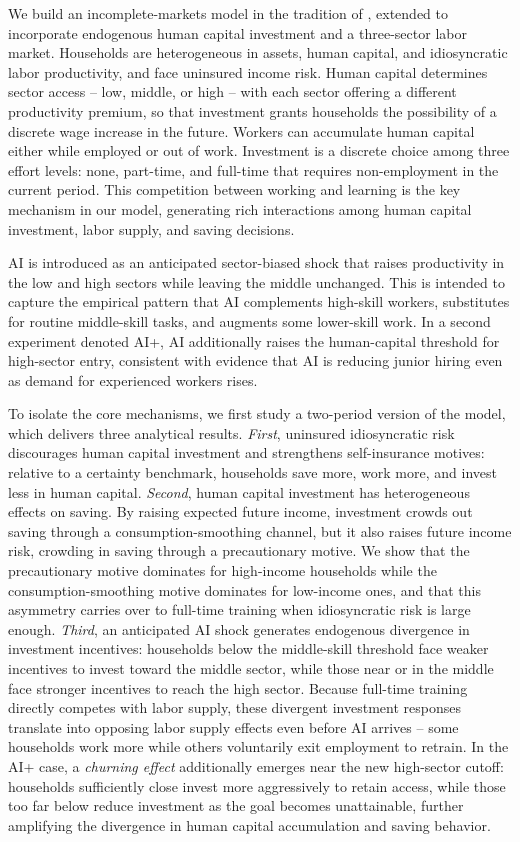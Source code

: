 \documentclass[12pt,english]{article}
\numberwithin{equation}{section}
\begin{document}
We build an incomplete-markets model in the tradition of \citet{aiyagari_uninsured_1994}, extended to incorporate endogenous human capital investment and a three-sector labor market. Households are heterogeneous in assets, human capital, and idiosyncratic labor productivity, and face uninsured income risk. Human capital determines sector access -- low, middle, or high -- with each sector offering a different productivity premium, so that investment grants households the possibility of a discrete wage increase in the future. Workers can accumulate human capital either while employed or out of work. Investment is a discrete choice among three effort levels: none, part-time, and full-time that requires non-employment in the current period. This competition between working and learning is the key mechanism in our model, generating rich interactions among human capital investment, labor supply, and saving decisions. 

AI is introduced as an anticipated sector-biased shock that raises productivity in the low and high sectors while leaving the middle unchanged. This is intended to capture the empirical pattern that AI complements high-skill workers, substitutes for routine middle-skill tasks, and augments some lower-skill work. In a second experiment denoted AI+, AI additionally raises the human-capital threshold for high-sector entry, consistent with evidence that AI is reducing junior hiring even as demand for experienced workers rises.

To isolate the core mechanisms, we first study a two-period version of the model, which delivers three analytical results. \emph{First}, uninsured idiosyncratic risk discourages human capital investment and strengthens self-insurance motives: relative to a certainty benchmark, households save more, work more, and invest less in human capital. \emph{Second}, human capital investment has heterogeneous effects on saving. By raising expected future income, investment crowds out saving through a consumption-smoothing channel, but it also raises future income risk, crowding in saving through a precautionary motive. We show that the precautionary motive dominates for high-income households while the consumption-smoothing motive dominates for low-income ones, and that this asymmetry carries over to full-time training when idiosyncratic risk is large enough. \emph{Third}, an anticipated AI shock generates endogenous divergence in investment incentives: households below the middle-skill threshold face weaker incentives to invest toward the middle sector, while those near or in the middle face stronger incentives to reach the high sector. Because full-time training directly competes with labor supply, these divergent investment responses translate into opposing labor supply effects even before AI arrives -- some households work more while others voluntarily exit employment to retrain. In the AI+ case, a \emph{churning effect} additionally emerges near the new high-sector cutoff: households sufficiently close invest more aggressively to retain access, while those too far below reduce investment as the goal becomes unattainable, further amplifying the divergence in human capital accumulation and saving behavior.
\end{document}
